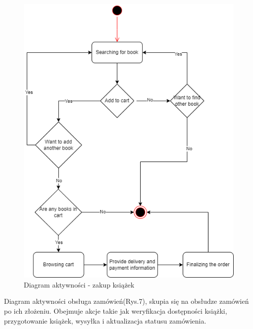 \documentclass[]{article}
\begin{document}
\begin{figure}[ht]
	\centering
	\includegraphics[scale=0.50]{zakup_ks.png}
	\caption{Diagram aktywności - zakup książek}
\end{figure}

Diagram aktywności obsługa zamówień(Rys.7), skupia się na obsłudze zamówień po ich złożeniu. Obejmuje akcje takie jak weryfikacja dostępności książki, przygotowanie książek, wysyłka i aktualizacja statusu zamówienia.
\end{document}

